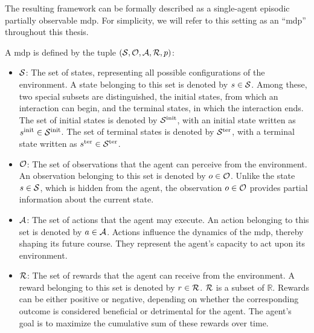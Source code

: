 The resulting framework can be formally described as a single-agent episodic partially observable \gls{mdp}.
For simplicity, we will refer to this setting as an \enquote{\gls{mdp}} throughout this thesis.

A \gls{mdp} is defined by the tuple \((\mathcal{S}, \mathcal{O}, \mathcal{A}, \mathcal{R}, p)\):  
\begin{itemize}
    \item \textbf{\(\mathcal{S}\)}: The set of states, representing all possible configurations of the environment.  
    A state belonging to this set is denoted by \(s \in \mathcal{S}\).  
    Among these, two special subsets are distinguished, the initial states, from which an interaction can begin, and the terminal states, in which the interaction ends.  
    The set of initial states is denoted by \(\mathcal{S}^{\mathrm{init}}\), with an initial state written as \(s^{\mathrm{init}} \in \mathcal{S}^{\mathrm{init}}\).
    The set of terminal states is denoted by \(\mathcal{S}^{\mathrm{ter}}\), with a terminal state written as \(s^{\mathrm{ter}} \in \mathcal{S}^{\mathrm{ter}}\).
    
    \item \textbf{\(\mathcal{O}\)}: The set of observations that the agent can perceive from the environment.
    An observation belonging to this set is denoted by \(o \in \mathcal{O}\). 
    Unlike the state \(s \in \mathcal{S}\), which is hidden from the agent, the observation \(o \in \mathcal{O}\) provides partial information about the current state.

    \item \textbf{\(\mathcal{A}\)}: The set of actions that the agent may execute.
    An action belonging to this set is denoted by \(a \in \mathcal{A}\). 
    Actions influence the dynamics of the \gls{mdp}, thereby shaping its future course.  
    They represent the agent's capacity to act upon its environment.

    \item \textbf{\(\mathcal{R}\)}: The set of rewards that the agent can receive from the environment.  
    A reward belonging to this set is denoted by \(r \in \mathcal{R}\). 
    \(\mathcal{R}\) is a subset of \(\mathbb{R}\).
    Rewards can be either positive or negative, depending on whether the corresponding outcome is considered beneficial or detrimental for the agent.  
    The agent's goal is to maximize the cumulative sum of these rewards over time.


\end{itemize}
